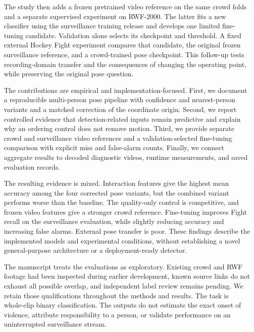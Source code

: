 The study then adds a frozen pretrained video reference on the same crowd folds and a separate supervised experiment on RWF-2000. The latter fits a new classifier using the surveillance training release and develops one limited fine-tuning candidate. Validation alone selects its checkpoint and threshold. A fixed external Hockey Fight experiment compares that candidate, the original frozen surveillance reference, and a crowd-trained pose checkpoint. This follow-up tests recording-domain transfer and the consequences of changing the operating point, while preserving the original pose question.

The contributions are empirical and implementation-focused. First, we document a reproducible multi-person pose pipeline with confidence and nearest-person variants and a matched correction of the coordinate origin. Second, we report controlled evidence that detection-related inputs remain predictive and explain why an ordering control does not remove motion. Third, we provide separate crowd and surveillance video references and a validation-selected fine-tuning comparison with explicit miss and false-alarm counts. Finally, we connect aggregate results to decoded diagnostic videos, runtime measurements, and saved evaluation records.

The resulting evidence is mixed. Interaction features give the highest mean accuracy among the four corrected pose variants, but the combined variant performs worse than the baseline. The quality-only control is competitive, and frozen video features give a stronger crowd reference. Fine-tuning improves Fight recall on the surveillance evaluation, while slightly reducing accuracy and increasing false alarms. External pose transfer is poor. These findings describe the implemented models and experimental conditions, without establishing a novel general-purpose architecture or a deployment-ready detector.

The manuscript treats the evaluations as exploratory. Existing crowd and RWF footage had been inspected during earlier development, known source links do not exhaust all possible overlap, and independent label review remains pending. We retain those qualifications throughout the methods and results. The task is whole-clip binary classification. The outputs do not estimate the exact onset of violence, attribute responsibility to a person, or validate performance on an uninterrupted surveillance stream.
